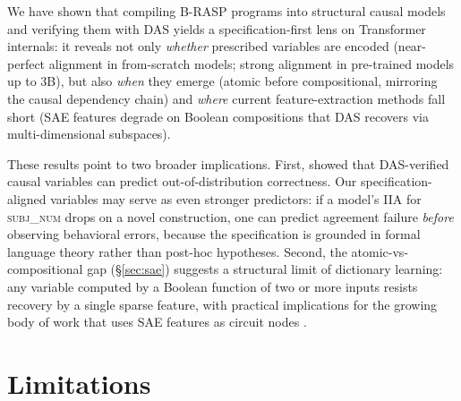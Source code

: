 \documentclass[11pt]{article}
\begin{document}
We have shown that compiling B-RASP programs into structural causal models and verifying them with DAS yields a specification-first lens on Transformer internals: it reveals not only \emph{whether} prescribed variables are encoded (near-perfect alignment in from-scratch models; strong alignment in pre-trained models up to 3B), but also \emph{when} they emerge (atomic before compositional, mirroring the causal dependency chain) and \emph{where} current feature-extraction methods fall short (SAE features degrade on Boolean compositions that DAS recovers via multi-dimensional subspaces).

These results point to two broader implications.
First, \citet{DBLP:conf/icml/0014TIYP25} showed that DAS-verified causal variables can predict out-of-distribution correctness.
Our specification-aligned variables may serve as even stronger predictors: if a model's IIA for \textsc{subj\_num} drops on a novel construction, one can predict agreement failure \emph{before} observing behavioral errors, because the specification is grounded in formal language theory rather than post-hoc hypotheses.
Second, the atomic-vs-compositional gap (\S\ref{sec:sae}) suggests a structural limit of dictionary learning: any variable computed by a Boolean function of two or more inputs resists recovery by a single sparse feature, with practical implications for the growing body of work that uses SAE features as circuit nodes \citep{DBLP:conf/iclr/MarksRMBBM25}. 

\section*{Limitations}
\end{document}
